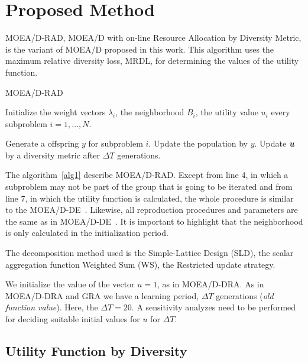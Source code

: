 \section{Proposed Method}

MOEA/D-RAD, MOEA/D with on-line Resource Allocation by Diversity Metric, is the variant of MOEA/D proposed in this work. This algorithm uses the maximum relative diversity loss, MRDL, for determining the values of the utility function. 

\begin{algorithm}[h]
	\caption{MOEA/D-RAD}\label{alg1}
	\begin{algorithmic}[1]

	\State Initialize the weight vectors $\lambda_i$, the neighborhood $B_i$, the utility value $u_i$ every subproblem $i=1,...,N$.
		
				\State Generate a offspring $y$ for subproblem $i$.
				\State Update the population by $y$.
			\EndIf
	\EndFor
	\State Update \textit{\textbf{u}} by a diversity metric after $\Delta T$ generations.
		\EndWhile
	\end{algorithmic}
\end{algorithm}


The algorithm~\ref{alg1} describe MOEA/D-RAD. Except from line 4, in which a subproblem may not be part of the group that is going to be iterated and from line 7, in which the utility function is calculated, the whole procedure is similar to the MOEA/D-DE~\cite{zhang2009performance}. Likewise, all reproduction procedures and parameters are the same as in MOEA/D-DE~\cite{li2009multiobjective}. It is important to highlight that the neighborhood is only calculated in the initialization period.

The decomposition method used is the Simple-Lattice Design (SLD), the scalar aggregation function Weighted Sum (WS), the Restricted update strategy.

We initialize the value of the vector $u=1$, as in MOEA/D-DRA. As in MOEA/D-DRA and GRA we have a learning period, $\Delta T$ generations (\textit{old function value}). Here, the $\Delta T=20$.   A sensitivity analyzes need to be performed for deciding suitable initial values for $u$ for $\Delta T$.

\subsection{Utility Function by Diversity} 


